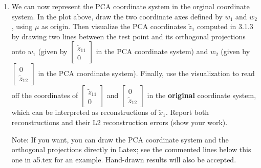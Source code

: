 \documentclass{article}
\def\blu#1{{\color{blu}#1}}
\begin{document}
\begin{enumerate}
  \item We can now represent the PCA coordinate system in the orginal coordinate system. \blu{In the plot above, draw the two coordinate axes defined by $w_1$ and $w_2$, using $\mu$ as origin. Then visualize the PCA coordinates $\tilde{z}_1$ computed in 3.1.3 by drawing two lines between the test point and its orthogonal projections onto $w_1$ (given by $\begin{bmatrix} \tilde{z}_{11} \\ 0 \end{bmatrix}$ in the PCA coordinate system) and $w_2$ (given by $\begin{bmatrix} 0 \\ \tilde{z}_{12} \end{bmatrix}$ in the PCA coordinate system). Finally, use the visualization to read off the coordinates of $\begin{bmatrix} \tilde{z}_{11} \\ 0 \end{bmatrix}$ and $\begin{bmatrix} 0 \\ \tilde{z}_{12} \end{bmatrix}$ in the {\bf original} coordinate system, which can be interpreted as reconstructions of $\tilde{x}_1$. Report both reconstructions and their L2 reconstruction errors (show your work).}
  
   Note: If you want, you can draw the PCA coordinate system and the orthogonal projections directly in Latex; see the commented lines below this one in a5.tex for an example. Hand-drawn results will also be accepted.
   
%
%
%


\end{enumerate}
\end{document}
